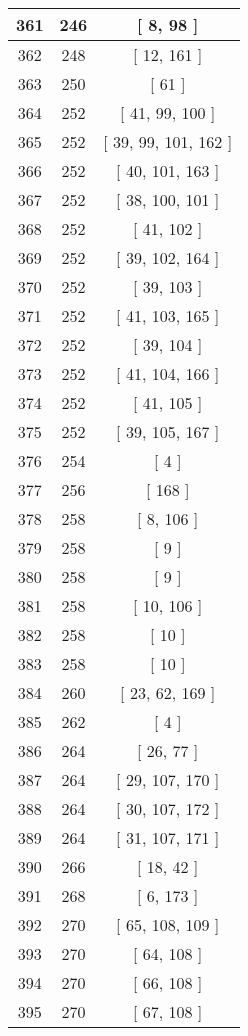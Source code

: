 \begin{center}
\begin{longtable}[H]{|| c c c ||}
\hline
361 & 246 & [ 8, 98 ] \\ 
\hline
362 & 248 & [ 12, 161 ] \\ 
\hline
363 & 250 & [ 61 ] \\ 
\hline
364 & 252 & [ 41, 99, 100 ] \\ 
\hline
365 & 252 & [ 39, 99, 101, 162 ] \\ 
\hline
366 & 252 & [ 40, 101, 163 ] \\ 
\hline
367 & 252 & [ 38, 100, 101 ] \\ 
\hline
368 & 252 & [ 41, 102 ] \\ 
\hline
369 & 252 & [ 39, 102, 164 ] \\ 
\hline
370 & 252 & [ 39, 103 ] \\ 
\hline
371 & 252 & [ 41, 103, 165 ] \\ 
\hline
372 & 252 & [ 39, 104 ] \\ 
\hline
373 & 252 & [ 41, 104, 166 ] \\ 
\hline
374 & 252 & [ 41, 105 ] \\ 
\hline
375 & 252 & [ 39, 105, 167 ] \\ 
\hline
376 & 254 & [ 4 ] \\ 
\hline
377 & 256 & [ 168 ] \\ 
\hline
378 & 258 & [ 8, 106 ] \\ 
\hline
379 & 258 & [ 9 ] \\ 
\hline
380 & 258 & [ 9 ] \\ 
\hline
381 & 258 & [ 10, 106 ] \\ 
\hline
382 & 258 & [ 10 ] \\ 
\hline
383 & 258 & [ 10 ] \\ 
\hline
384 & 260 & [ 23, 62, 169 ] \\ 
\hline
385 & 262 & [ 4 ] \\ 
\hline
386 & 264 & [ 26, 77 ] \\ 
\hline
387 & 264 & [ 29, 107, 170 ] \\ 
\hline
388 & 264 & [ 30, 107, 172 ] \\ 
\hline
389 & 264 & [ 31, 107, 171 ] \\ 
\hline
390 & 266 & [ 18, 42 ] \\ 
\hline
391 & 268 & [ 6, 173 ] \\ 
\hline
392 & 270 & [ 65, 108, 109 ] \\ 
\hline
393 & 270 & [ 64, 108 ] \\ 
\hline
394 & 270 & [ 66, 108 ] \\ 
\hline
395 & 270 & [ 67, 108 ] \\ 

\end{longtable}
\end{center}
